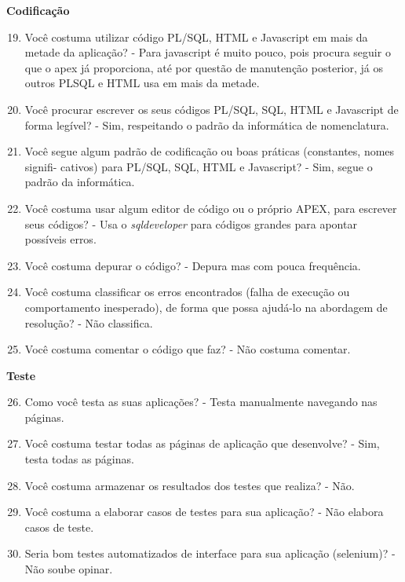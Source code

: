 \begin{apendicesenv}
\textbf{Codificação}

\begin{enumerate}
	\setcounter{enumi}{18}
	\item Você costuma utilizar código PL/SQL, HTML e Javascript em mais da metade da
	aplicação?\newline
	- Para javascript é muito pouco, pois procura seguir o que o apex já proporciona, até por questão de manutenção posterior, já os outros PLSQL e HTML usa em mais da metade.
	\item Você procurar escrever os seus códigos PL/SQL, SQL, HTML e Javascript de forma
	legível?\newline
	- Sim, respeitando o padrão da informática de nomenclatura.
	\item Você segue algum padrão de codificação ou boas práticas (constantes, nomes signifi-
	cativos) para PL/SQL, SQL, HTML e Javascript?\newline
	- Sim, segue o padrão da informática.
	\item Você costuma usar algum editor de código ou o próprio APEX, para escrever seus
	códigos?\newline
	- Usa o \textit{sqldeveloper} para códigos grandes para apontar possíveis erros.
	\item Você costuma depurar o código?\newline
	- Depura mas com pouca frequência.
	\item Você costuma classificar os erros encontrados (falha de execução ou comportamento
	inesperado), de forma que possa ajudá-lo na abordagem de resolução?\newline
	- Não classifica.
	\item Você costuma comentar o código que faz?\newline
	- Não costuma comentar.
\end{enumerate}

\textbf{Teste}

\begin{enumerate}
	\setcounter{enumi}{25}
	\item Como você testa as suas aplicações?\newline
	- Testa manualmente navegando nas páginas.
	\item Você costuma testar todas as páginas de aplicação que desenvolve?\newline
	- Sim, testa todas as páginas.
	\item Você costuma armazenar os resultados dos testes que realiza?\newline
	- Não.
	\item Você costuma a elaborar casos de testes para sua aplicação?\newline
	- Não elabora casos de teste.
	\item Seria bom testes automatizados de interface para sua aplicação (selenium)?\newline
	- Não soube opinar.
\end{enumerate}


\end{apendicesenv}
